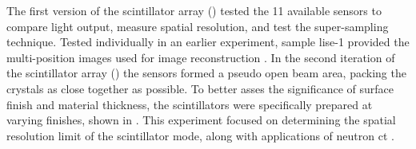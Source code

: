 \documentclass[../../../main.tex]{subfiles}
\begin{document}
    The first version of the scintillator array () tested the \num{11} available sensors to compare light output, measure spatial resolution, and test the \gls{super-sampling} technique.
    Tested individually in an earlier experiment, sample \gls{lise}-1 provided the multi-position images used for image reconstruction \cite{Lukosi_2016a}.
    In the second iteration of the scintillator array () the sensors formed a pseudo open beam area, packing the crystals as close together as possible.
    To better asses the significance of surface finish and material thickness, the scintillators were specifically prepared at varying finishes, shown in .
    This experiment focused on determining the spatial resolution limit of the scintillator mode, along with applications of neutron \gls{ct} \cite{Lukosi_2017}.
\end{document}
